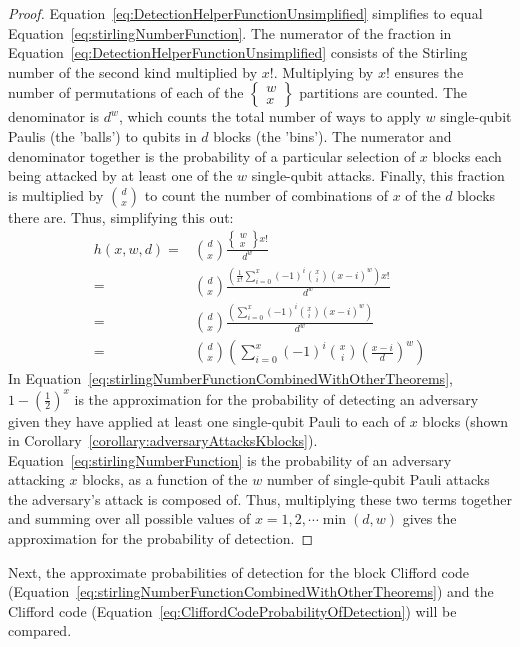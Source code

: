 \begin{proof}
Equation~\eqref{eq:DetectionHelperFunctionUnsimplified} simplifies to equal Equation~\eqref{eq:stirlingNumberFunction}. The numerator of the fraction in Equation~\eqref{eq:DetectionHelperFunctionUnsimplified} consists of the Stirling number of the second kind multiplied by $x!$. Multiplying by $x!$ ensures the number of permutations of each of the $\left\{\begin{smallmatrix}w\\x\end{smallmatrix}\right\}$ partitions are counted. The denominator is $d^w$, which counts the total number of ways to apply $w$ single-qubit Paulis (the 'balls') to qubits in $d$ blocks (the 'bins'). The numerator and denominator together is the probability of a particular selection of $x$ blocks each being attacked by at least one of the $w$ single-qubit attacks. Finally, this fraction is multiplied by ${d \choose x}$ to count the number of combinations of $x$ of the $d$ blocks there are. Thus, simplifying this out:
\begin{align}
h(x,w,d)=&{d \choose x} \frac{\left\{\begin{smallmatrix}w\\x\end{smallmatrix}\right\}x!}{d^w} \label{eq:DetectionHelperFunctionUnsimplified} \\
=& {d \choose x} \frac{\left(\frac{1}{x !} \sum_{i=0}^{x}(-1)^{i}{x \choose i}(x-i)^{w}\right)x!}{d^w}\\
=& {d \choose x} \frac{\left( \sum_{i=0}^{x}(-1)^{i}{x \choose i}(x-i)^{w}\right)}{d^w}\\
=& {d \choose x}\left(\sum_{i=0} ^{x}(-1)^{i}{x \choose i}\left(\frac{x-i}{d}\right)^w \right)
\end{align}
In Equation~\eqref{eq:stirlingNumberFunctionCombinedWithOtherTheorems}, $1-\left(\frac{1}{2}\right)^{x}$ is the approximation for the probability of detecting an adversary given they have applied at least one single-qubit Pauli to each of $x$ blocks (shown in Corollary~\ref{corollary:adversaryAttacksKblocks}). Equation~\eqref{eq:stirlingNumberFunction} is the probability of an adversary attacking $x$ blocks, as a function of the $w$ number of single-qubit Pauli attacks the adversary's attack is composed of. Thus, multiplying these two terms together and summing over all possible values of $x = 1, 2, \cdots \min(d,w)$ gives the approximation for the probability of detection.
\end{proof}
Next, the approximate probabilities of detection for the block Clifford code (Equation~\eqref{eq:stirlingNumberFunctionCombinedWithOtherTheorems}) and the Clifford code (Equation~\eqref{eq:CliffordCodeProbabilityOfDetection}) will be compared.
